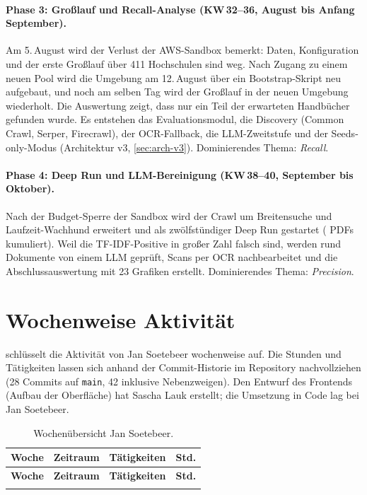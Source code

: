 \paragraph{Phase 3: Großlauf und Recall-Analyse (KW\,32--36, August bis Anfang September).}
Am 5.\,August wird der Verlust der AWS-Sandbox bemerkt: Daten, Konfiguration und der erste Großlauf über 411 Hochschulen sind weg. Nach Zugang zu einem neuen Pool wird die Umgebung am 12.\,August über ein Bootstrap-Skript neu aufgebaut, und noch am selben Tag wird der Großlauf in der neuen Umgebung wiederholt. Die Auswertung zeigt, dass nur ein Teil der erwarteten Handbücher gefunden wurde. Es entstehen das Evaluationsmodul, die Discovery (Common Crawl, Serper, Firecrawl), der OCR-Fallback, die LLM-Zweitstufe und der Seeds-only-Modus (Architektur v3, \cref{sec:arch-v3}). Dominierendes Thema: \emph{Recall}.

\paragraph{Phase 4: Deep Run und LLM-Bereinigung (KW\,38--40, September bis Oktober).}
Nach der Budget-Sperre der Sandbox wird der Crawl um Breitensuche und Laufzeit-Wachhund erweitert und als zwölfstündiger Deep Run gestartet (\zDocsTotal{} PDFs kumuliert). Weil die TF-IDF-Positive in großer Zahl falsch sind, werden rund \zLLMReviewed{} Dokumente von einem LLM geprüft, Scans per OCR nachbearbeitet und die Abschlussauswertung mit 23 Grafiken erstellt. Dominierendes Thema: \emph{Precision}.

\section{Wochenweise Aktivität}
 schlüsselt die Aktivität von Jan Soetebeer wochenweise auf. Die Stunden und Tätigkeiten lassen sich anhand der Commit-Historie im Repository nachvollziehen (28 Commits auf \texttt{main}, 42 inklusive Nebenzweigen). Den Entwurf des Frontends (Aufbau der Oberfläche) hat Sascha Lauk erstellt; die Umsetzung in Code lag bei Jan Soetebeer.

{\small
\begin{longtable}{@{}l l p{8.9cm} r@{}}
\caption{Wochenübersicht Jan Soetebeer.}\label{tab:wochen-jan}\\
\toprule
\textbf{Woche} & \textbf{Zeitraum} & \textbf{Tätigkeiten} & \textbf{Std.} \\
\midrule
\endfirsthead
\toprule
\textbf{Woche} & \textbf{Zeitraum} & \textbf{Tätigkeiten} & \textbf{Std.} \\
\midrule
\endhead
\bottomrule
\endlastfoot

\end{longtable}}

